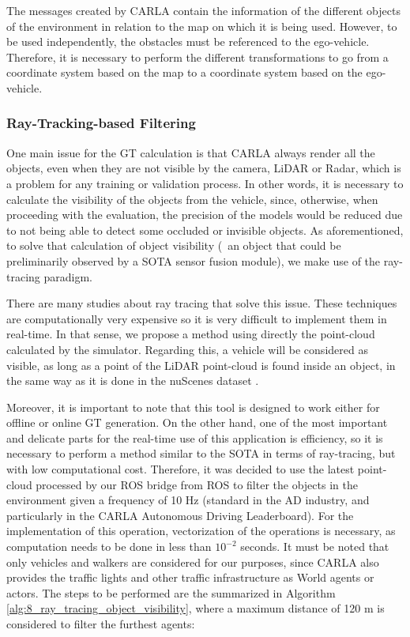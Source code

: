 The messages created by CARLA contain the information of the different objects of the environment in relation to the map on which it is being used. However, to be used independently, the obstacles must be referenced to the ego-vehicle. Therefore, it is necessary to perform the different transformations to go from a coordinate system based on the map to a coordinate system based on the ego-vehicle.

\subsubsection{Ray-Tracking-based Filtering}
\label{subsubsec:8_ad_perdevkit_object_visibility}

One main issue for the \ac{GT} calculation is that \ac{CARLA} always render all the objects, even when they are not visible by the camera, LiDAR or Radar, which is a problem for any training or validation process. In other words, it is necessary to calculate the visibility of the objects from the vehicle, since, otherwise, when proceeding with the evaluation, the precision of the models would be reduced due to not being able to detect some occluded or invisible objects. As aforementioned, to solve that calculation of object visibility (\ie \ an object that could be preliminarily observed by a \ac{SOTA} sensor fusion module), we make use of the ray-tracing paradigm.

There are many studies about ray tracing that solve this issue. These techniques \cite{raytracing1, raytracing2} are computationally very expensive so it is very difficult to implement them in real-time. In that sense, we propose a method using directly the point-cloud calculated by the simulator. Regarding this, a vehicle will be considered as visible, as long as a point of the LiDAR point-cloud is found inside an object, in the same way as it is done in the nuScenes dataset \cite{caesar2020nuscenes}. 

Moreover, it is important to note that this tool is designed to work either for offline or online \ac{GT} generation. On the other hand, one of the most important and delicate parts for the real-time use of this application is efficiency, so it is necessary to perform a method similar to the \ac{SOTA} in terms of ray-tracing, but with low computational cost. Therefore, it was decided to use the latest point-cloud processed by our \ac{ROS} bridge from ROS to filter the objects in the environment given a frequency of 10 Hz (standard in the \ac{AD} industry, and particularly in the \ac{CARLA} Autonomous Driving Leaderboard). For the implementation of this operation, vectorization of the operations is necessary, as computation needs to be done in less than $10^{-2}$ seconds. It must be noted that only vehicles and walkers are considered for our purposes, since \ac{CARLA} also provides the traffic lights and other traffic infrastructure as World agents or actors. The steps to be performed are the summarized in Algorithm \ref{alg:8_ray_tracing_object_visibility}, where a maximum distance of 120 m is considered to filter the furthest agents:

